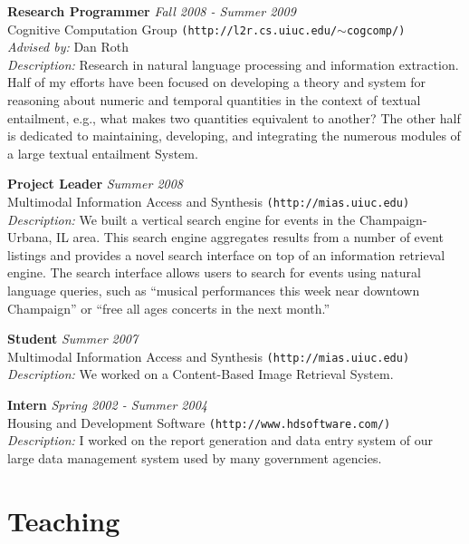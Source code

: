 \documentclass{report}
\begin{document}
{\bf Research Programmer} \hfill {\it Fall 2008 - Summer 2009} \\
Cognitive Computation Group \texttt{(http://l2r.cs.uiuc.edu/$\sim$cogcomp/)} \\
{\sl Advised by:} Dan Roth \\
{\sl Description:} Research in natural language processing and information extraction. Half of my efforts have been focused on developing a theory and system for reasoning about numeric and temporal quantities in the context of textual entailment, e.g., what makes two quantities equivalent to another? The other half is dedicated to maintaining, developing, and integrating the numerous modules of a large textual entailment System.

{\bf Project Leader} \hfill {\it Summer 2008} \\
Multimodal Information Access and Synthesis \texttt{(http://mias.uiuc.edu)} \\
{\sl Description:} We built a vertical search engine for events in the Champaign-Urbana, IL area. This search engine aggregates results from a number of event listings and provides a novel search interface on top of an information retrieval engine. The search interface allows users to search for events using natural language queries, such as ``musical performances this week near downtown Champaign'' or ``free all ages concerts in the next month.''

{\bf Student} \hfill {\it Summer 2007} \\
Multimodal Information Access and Synthesis \texttt{(http://mias.uiuc.edu)} \\
{\sl Description:} We worked on a Content-Based Image Retrieval System.

{\bf Intern} \hfill {\it Spring 2002 - Summer 2004} \\
Housing and Development Software \texttt{(http://www.hdsoftware.com/)} \\
{\sl Description:} I worked on the report generation and data entry system of our large data management system used by many government agencies.


\section*{Teaching}
\end{document}
